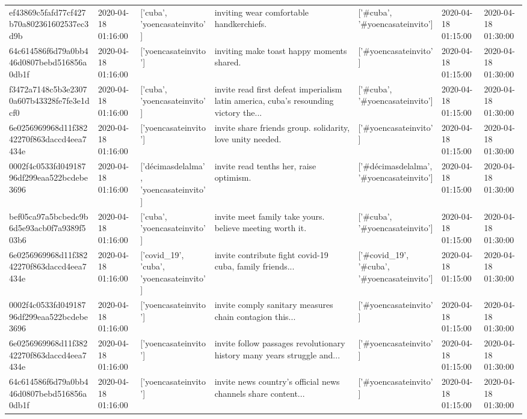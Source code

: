 \begin{tabular}{lllllll}
ef43869c5fafd77cf427b70a802361602537ec3d9b & 2020-04-18 01:16:00 & ['cuba', 'yoencasateinvito'] & inviting wear comfortable handkerchiefs. & ['#cuba', '#yoencasateinvito'] & 2020-04-18 01:15:00 & 2020-04-18 01:30:00 \\
64c614586f6d79a0bb446d0807bebd516856a0db1f & 2020-04-18 01:16:00 & ['yoencasateinvito'] & inviting make toast happy moments shared. & ['#yoencasateinvito'] & 2020-04-18 01:15:00 & 2020-04-18 01:30:00 \\
f3472a7148c5b3e23070a607b43328fe7fe3e1dcf0 & 2020-04-18 01:16:00 & ['cuba', 'yoencasateinvito'] & invite read first defeat imperialism latin america, cuba's resounding victory the... & ['#cuba', '#yoencasateinvito'] & 2020-04-18 01:15:00 & 2020-04-18 01:30:00 \\
6e0256969968d11f38242270f863daccd4eea7434e & 2020-04-18 01:16:00 & ['yoencasateinvito'] & invite share friends group. solidarity, love unity needed. & ['#yoencasateinvito'] & 2020-04-18 01:15:00 & 2020-04-18 01:30:00 \\
0002f4c0533fd04918796df299eaa522bcdebe3696 & 2020-04-18 01:16:00 & ['décimasdelalma', 'yoencasateinvito'] & invite read tenths her, raise optimism. & ['#décimasdelalma', '#yoencasateinvito'] & 2020-04-18 01:15:00 & 2020-04-18 01:30:00 \\
bef05ca97a5bcbedc9b6d5e93acb0f7a9389f503b6 & 2020-04-18 01:16:00 & ['cuba', 'yoencasateinvito'] & invite meet family take yours. believe meeting worth it. & ['#cuba', '#yoencasateinvito'] & 2020-04-18 01:15:00 & 2020-04-18 01:30:00 \\
6e0256969968d11f38242270f863daccd4eea7434e & 2020-04-18 01:16:00 & ['covid_19', 'cuba', 'yoencasateinvito'] & invite contribute fight covid-19 cuba, family friends... & ['#covid_19', '#cuba', '#yoencasateinvito'] & 2020-04-18 01:15:00 & 2020-04-18 01:30:00 \\
0002f4c0533fd04918796df299eaa522bcdebe3696 & 2020-04-18 01:16:00 & ['yoencasateinvito'] & invite comply sanitary measures chain contagion this... & ['#yoencasateinvito'] & 2020-04-18 01:15:00 & 2020-04-18 01:30:00 \\
6e0256969968d11f38242270f863daccd4eea7434e & 2020-04-18 01:16:00 & ['yoencasateinvito'] & invite follow passages revolutionary history many years struggle and... & ['#yoencasateinvito'] & 2020-04-18 01:15:00 & 2020-04-18 01:30:00 \\
64c614586f6d79a0bb446d0807bebd516856a0db1f & 2020-04-18 01:16:00 & ['yoencasateinvito'] & invite news country's official news channels share content... & ['#yoencasateinvito'] & 2020-04-18 01:15:00 & 2020-04-18 01:30:00 \\

\end{tabular}
